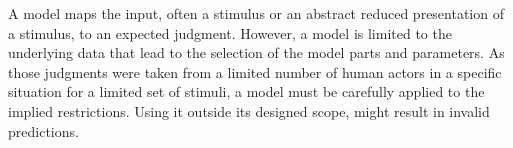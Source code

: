 A model maps the input, often a stimulus or an abstract reduced presentation of a stimulus, to an expected judgment.
However, a model is limited to the underlying data that lead to the selection of the model parts and parameters.
As those judgments were taken from a limited number of human actors in a specific situation for a limited set of stimuli, a model must be carefully applied to the implied restrictions.
Using it outside its designed scope, might result in invalid predictions.
